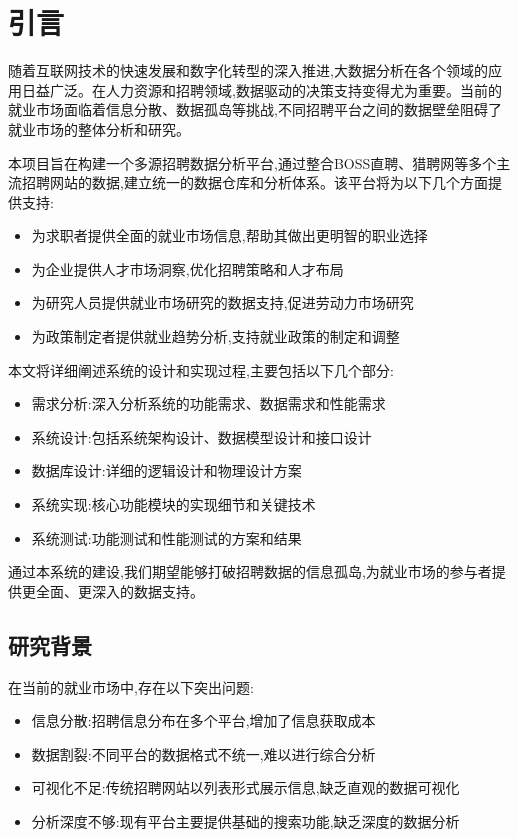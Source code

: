 \section{引言}

随着互联网技术的快速发展和数字化转型的深入推进,大数据分析在各个领域的应用日益广泛。在人力资源和招聘领域,数据驱动的决策支持变得尤为重要。当前的就业市场面临着信息分散、数据孤岛等挑战,不同招聘平台之间的数据壁垒阻碍了就业市场的整体分析和研究。

本项目旨在构建一个多源招聘数据分析平台,通过整合BOSS直聘、猎聘网等多个主流招聘网站的数据,建立统一的数据仓库和分析体系。该平台将为以下几个方面提供支持:

\begin{itemize}
    \item 为求职者提供全面的就业市场信息,帮助其做出更明智的职业选择
    \item 为企业提供人才市场洞察,优化招聘策略和人才布局
    \item 为研究人员提供就业市场研究的数据支持,促进劳动力市场研究
    \item 为政策制定者提供就业趋势分析,支持就业政策的制定和调整
\end{itemize}

本文将详细阐述系统的设计和实现过程,主要包括以下几个部分:
\begin{itemize}
    \item 需求分析:深入分析系统的功能需求、数据需求和性能需求
    \item 系统设计:包括系统架构设计、数据模型设计和接口设计
    \item 数据库设计:详细的逻辑设计和物理设计方案
    \item 系统实现:核心功能模块的实现细节和关键技术
    \item 系统测试:功能测试和性能测试的方案和结果
\end{itemize}

通过本系统的建设,我们期望能够打破招聘数据的信息孤岛,为就业市场的参与者提供更全面、更深入的数据支持。

\subsection{研究背景}

在当前的就业市场中,存在以下突出问题:

\begin{itemize}
    \item 信息分散:招聘信息分布在多个平台,增加了信息获取成本
    \item 数据割裂:不同平台的数据格式不统一,难以进行综合分析
    \item 可视化不足:传统招聘网站以列表形式展示信息,缺乏直观的数据可视化
    \item 分析深度不够:现有平台主要提供基础的搜索功能,缺乏深度的数据分析
\end{itemize}

